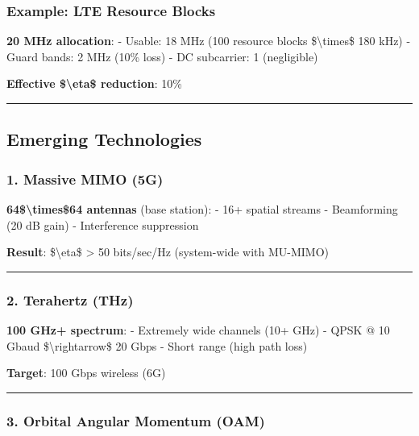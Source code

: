 \subsubsection{Example: LTE Resource
Blocks}\label{example-lte-resource-blocks}

\textbf{20 MHz allocation}: - Usable: 18 MHz (100 resource blocks
\$\textbackslash times\$ 180 kHz) - Guard bands: 2 MHz (10\% loss) - DC
subcarrier: 1 (negligible)

\textbf{Effective \$\textbackslash eta\$ reduction}: 10\%

\begin{center}\rule{0.5\linewidth}{0.5pt}\end{center}

\subsection{Emerging Technologies}\label{emerging-technologies}

\subsubsection{1. Massive MIMO (5G)}\label{massive-mimo-5g}

\textbf{64\$\textbackslash times\$64 antennas} (base station): - 16+
spatial streams - Beamforming (20 dB gain) - Interference suppression

\textbf{Result}: \$\textbackslash eta\$ \textgreater{} 50 bits/sec/Hz
(system-wide with MU-MIMO)

\begin{center}\rule{0.5\linewidth}{0.5pt}\end{center}

\subsubsection{2. Terahertz (THz)}\label{terahertz-thz}

\textbf{100 GHz+ spectrum}: - Extremely wide channels (10+ GHz) - QPSK @
10 Gbaud \$\textbackslash rightarrow\$ 20 Gbps - Short range (high path
loss)

\textbf{Target}: 100 Gbps wireless (6G)

\begin{center}\rule{0.5\linewidth}{0.5pt}\end{center}

\subsubsection{3. Orbital Angular Momentum
(OAM)}\label{orbital-angular-momentum-oam}

